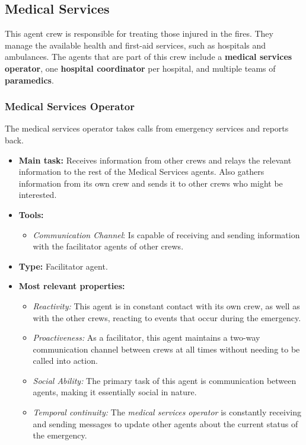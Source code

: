 \subsection{Medical Services}
This agent crew is responsible for treating those injured in the fires. 
They manage the available health and first-aid services, such as hospitals and ambulances. 
The agents that are part of this crew include a \textbf{medical services operator}, one \textbf{hospital coordinator} per hospital, and multiple teams of \textbf{paramedics}.

\subsubsection{Medical Services Operator}
The medical services operator takes calls from emergency services and reports back.

\begin{itemize}
    \item \textbf{Main task:} Receives information from other crews and relays the relevant information to the rest of the Medical Services agents. Also gathers information from its own crew and sends it to other crews who might be interested.
    \item \textbf{Tools:}
    \begin{itemize}
        \item \textit{Communication Channel}: Is capable of receiving and sending information with the facilitator agents of other crews.
    \end{itemize}
    \item \textbf{Type:} Facilitator agent.
    \item \textbf{Most relevant properties:}
    \begin{itemize}
        \item \textit{Reactivity:} This agent is in constant contact with its own crew, as well as with the other crews, reacting to events that occur during the emergency.
        \item \textit{Proactiveness:} As a facilitator, this agent maintains a two-way communication channel between crews at all times without needing to be called into action.
        \item \textit{Social Ability:} The primary task of this agent is communication between agents, making it essentially social in nature.
        \item \textit{Temporal continuity:} The \textit{medical services operator} is constantly receiving and sending messages to update other agents about the current status of the emergency.
    \end{itemize}
\end{itemize}

